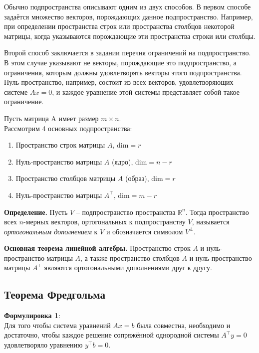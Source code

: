 \documentclass[11pt,a4paper]{article}
\providecommand{\tightlist}{%
      \setlength{\itemsep}{0pt}\setlength{\parskip}{0pt}}
\begin{document}
Обычно подпространства описывают одним из двух способов. В первом
способе задаётся множество векторов, порождающих данное подпространство.
Например, при определении пространства строк или пространства столбцов
некоторой матрицы, когда указываются порождающие эти пространства строки
или столбцы.

Второй способ заключается в задании перечня ограничений на
подпространство. В этом случае указывают не векторы, порождающие это
подпространство, а ограничения, которым должны удовлетворять векторы
этого подпространства. Нуль-пространство, например, состоит из всех
векторов, удовлетворяющих системе \(Ax=0\), и каждое уравнение этой
системы представляет собой такое ограничение.

Пусть матрица A имеет размер \(m \times n\).\\
Рассмотрим 4 основных подпространства:

\begin{enumerate}
\def\labelenumi{\arabic{enumi}.}
\tightlist
\item
  Пространство строк матрицы \(A\), \(\mathrm{dim} = r\)
\item
  Нуль-пространство матрицы \(A\) (ядро), \(\mathrm{dim} = n-r\)
\item
  Пространство столбцов матрицы \(A\) (образ), \(\mathrm{dim} = r\)
\item
  Нуль-пространство матрицы \(A^\top\), \(\mathrm{dim} = m-r\)
\end{enumerate}

    \textbf{Определение.} Пусть \(V\) -- подпространство пространства
\(\mathbb{R}^n\). Тогда пространство всех \(n\)-мерных векторов,
ортогональных к подпространству \(V\), называется \emph{ортогональным
дополнением} к \(V\) и обозначается символом \(V^\perp\).

\textbf{Основная теорема линейной алгебры.} Пространство строк \(A\) и
нуль-пространство матрицы \(A\), а также пространство столбцов \(A\) и
нуль-пространство матрицы \(A^\top\) являются ортогональными
дополнениями друг к другу.

    \hypertarget{ux442ux435ux43eux440ux435ux43cux430-ux444ux440ux435ux434ux433ux43eux43bux44cux43cux430}{%
\subsection{Теорема
Фредгольма}\label{ux442ux435ux43eux440ux435ux43cux430-ux444ux440ux435ux434ux433ux43eux43bux44cux43cux430}}

\textbf{Формулировка 1}:\\
Для того чтобы система уравнений \(Ax=b\) была совместна, необходимо и
достаточно, чтобы каждое решение сопряжённой однородной системы
\(A^\top y = 0\) удовлетворяло уравнению \(y^\top b = 0\).
\end{document}
